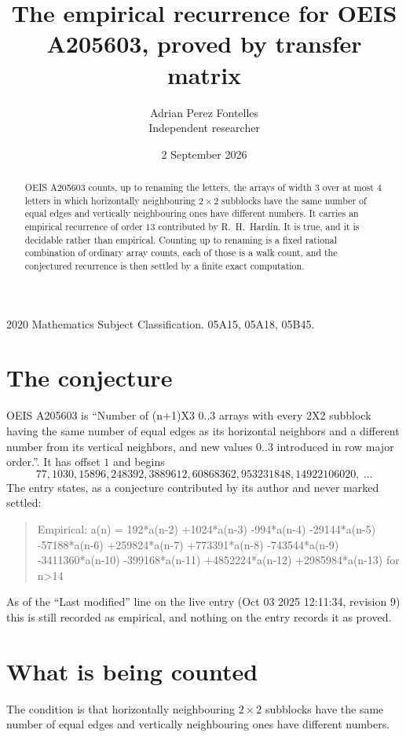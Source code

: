 \documentclass[11pt,a4paper]{article}
\title{The empirical recurrence for OEIS A205603, proved by transfer matrix}
\author{Adrian Perez Fontelles\\ \small Independent researcher}
\date{2 September 2026}
\theoremstyle{plain}
\theoremstyle{definition}
\begin{document}
\maketitle

\begin{abstract}
OEIS A205603 counts, up to renaming the letters, the arrays of width $3$ over at most $4$
letters in which horizontally neighbouring $2\times2$ subblocks have the same number of equal edges and vertically neighbouring ones have different numbers. It carries an empirical recurrence of order $13$ contributed by
R.~H.~Hardin. It is true, and it is decidable rather than empirical. Counting up to renaming is
a fixed rational combination of ordinary array counts, each of those is a walk count, and the
conjectured recurrence is then settled by a finite exact computation.
\end{abstract}

\noindent\small 2020 Mathematics Subject Classification. 05A15, 05A18, 05B45.\normalsize

\section{The conjecture}

OEIS A205603 is ``Number of (n+1)X3 0..3 arrays with every 2X2 subblock having the same number of equal edges as its horizontal neighbors and a different number from its vertical neighbors, and new values 0..3 introduced in row major order.''. It has offset $1$ and begins
\[
77, 1030, 15896, 248392, 3889612, 60868362, 953231848, 14922106020,\ \dots
\]
The entry states, as a conjecture contributed by its author and never marked settled:
\begin{quote}
Empirical: a(n) = 192*a(n-2) +1024*a(n-3) -994*a(n-4) -29144*a(n-5) -57188*a(n-6) +259824*a(n-7) +773391*a(n-8) -743544*a(n-9) -3411360*a(n-10) -399168*a(n-11) +4852224*a(n-12) +2985984*a(n-13) for n>14
\end{quote}
As of the ``Last modified'' line on the live entry (Oct 03 2025 12:11:34, revision 9) this is still
recorded as empirical, and nothing on the entry records it as proved.

\section{What is being counted}

The condition is that horizontally neighbouring $2\times2$ subblocks have the same number of equal edges and vertically neighbouring ones have different numbers.
\end{document}
